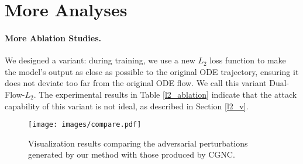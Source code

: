 \section{More Analyses}

\paragraph{More Ablation Studies.}

We designed a variant: during training, we use a new $L_2$ loss function to make the model's output as close as possible to the original ODE trajectory, ensuring it does not deviate too far from the original ODE flow. We call this variant Dual-Flow-$L_2$. The experimental results in Table \ref{l2_ablation} indicate that the attack capability of this variant is not ideal, as described in Section \ref{l2_v}.

\begin{table}[htbp]
  \caption{Comparison of Dual-Flow and Dual-Flow-$L_2$. The surrogate model is Res-152. }
  \label{l2_ablation}%
  \centering
  \vskip 0.15in
  \begin{small}
  \begin{sc}
  \end{sc}
  \end{small}
  \vskip -0.1in
\end{table}%



\begin{figure}[ht]
\vskip 0.2in
\begin{center}
\centerline{\texttt{[image: images/compare.pdf]}}
\caption{Visualization results comparing the adversarial perturbations generated by our method with those produced by CGNC.}

\label{fig:compare}
\end{center}
\vskip -0.2in
\end{figure}


